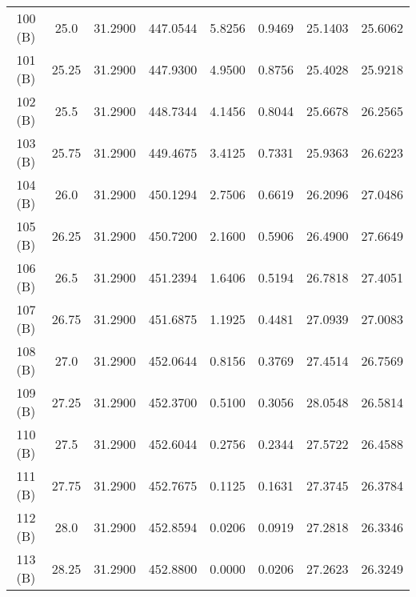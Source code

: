 \begin{landscape}
{\begin{longtable}{c|c|c|c|c|c|c|c}
100 (B)&25.0&31.2900&447.0544&5.8256&0.9469&25.1403&25.6062 \\
101 (B)&25.25&31.2900&447.9300&4.9500&0.8756&25.4028&25.9218 \\
102 (B)&25.5&31.2900&448.7344&4.1456&0.8044&25.6678&26.2565 \\
103 (B)&25.75&31.2900&449.4675&3.4125&0.7331&25.9363&26.6223 \\
104 (B)&26.0&31.2900&450.1294&2.7506&0.6619&26.2096&27.0486 \\
105 (B)&26.25&31.2900&450.7200&2.1600&0.5906&26.4900&27.6649 \\
106 (B)&26.5&31.2900&451.2394&1.6406&0.5194&26.7818&27.4051 \\
107 (B)&26.75&31.2900&451.6875&1.1925&0.4481&27.0939&27.0083 \\
108 (B)&27.0&31.2900&452.0644&0.8156&0.3769&27.4514&26.7569 \\
109 (B)&27.25&31.2900&452.3700&0.5100&0.3056&28.0548&26.5814 \\
110 (B)&27.5&31.2900&452.6044&0.2756&0.2344&27.5722&26.4588 \\
111 (B)&27.75&31.2900&452.7675&0.1125&0.1631&27.3745&26.3784 \\
112 (B)&28.0&31.2900&452.8594&0.0206&0.0919&27.2818&26.3346 \\
113 (B)&28.25&31.2900&452.8800&0.0000&0.0206&27.2623&26.3249 \\
\end{longtable}}\end{landscape}
